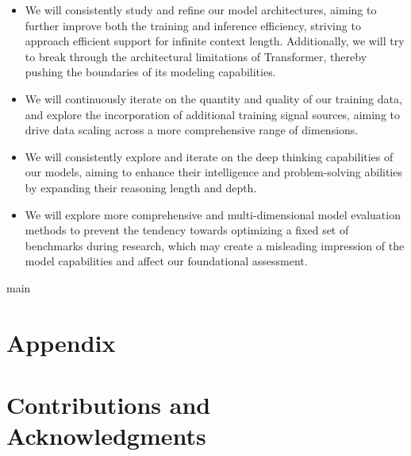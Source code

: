 \documentclass[11pt,a4paper]{article}
\begin{document}
\begin{itemize}
\item We will consistently study and refine our model architectures, aiming to further improve both the training and inference efficiency, striving to approach efficient support for infinite context length. Additionally, we will try to break through the architectural limitations of Transformer, thereby pushing the boundaries of its modeling capabilities.
\item We will continuously iterate on the quantity and quality of our training data, and explore the incorporation of additional training signal sources, aiming to drive data scaling across a more comprehensive range of dimensions.
\item We will consistently explore and iterate on the deep thinking capabilities of our models, aiming to enhance their intelligence and problem-solving abilities by expanding their reasoning length and depth.
\item We will explore more comprehensive and multi-dimensional model evaluation methods to prevent the tendency towards optimizing a fixed set of benchmarks during research, which may create a misleading impression of the model capabilities and affect our foundational assessment.
\end{itemize}

main

\section{Appendix}

\section{Contributions and Acknowledgments}
\end{document}
